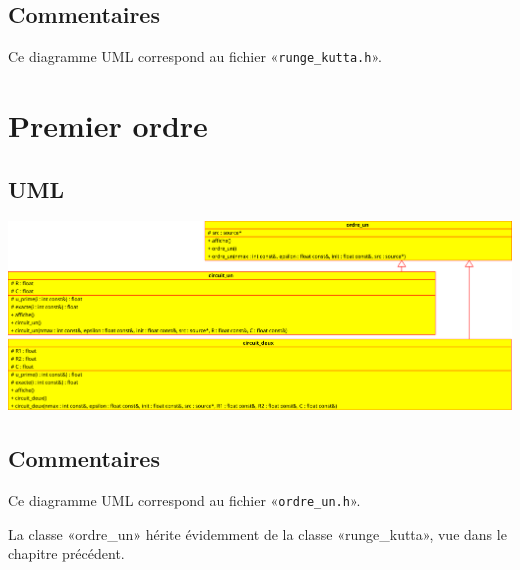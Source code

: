 \documentclass{report}
\begin{document}
    \section{Commentaires}
        Ce diagramme UML correspond au fichier «\verb|runge_kutta.h|».

\chapter{Premier ordre}
    \begin{multicols}{2}
        \section{UML}
            \includegraphics[width=\linewidth+\linewidth,angle=90]{images/ordre_un}

        \section{Commentaires}
            Ce diagramme UML correspond au fichier «\verb|ordre_un.h|».

            La classe «ordre\_un» hérite évidemment de la classe «runge\_kutta», vue dans le chapitre précédent.
    \end{multicols}
\end{document}
